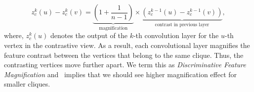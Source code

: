 \begin{equation}
z_c^{k}(u) - z_c^{k}(v) = \underbrace{
  \left (1 + \frac{1}{n-1} \right )
  }_{\text{magnification}}
  \times
  \underbrace{
    \left ( z_c^{k-1}(u) - z_c^{k-1}(v) \right )
    }_{\text{contrast in previous layer}}, \label{eq:disccontrastsimple}
\end{equation}
where, $z_c^{k}(u)$ denotes the output of the $k$-th convolution layer for the $u$-th vertex in the contrastive view. As a result, each convolutional layer magnifies the feature contrast between the vertices that belong to the same clique. Thus, the contrasting vertices move further apart. We term this as \emph{Discriminative Feature Magnification} and~ implies that we should see higher magnification effect for smaller cliques.


